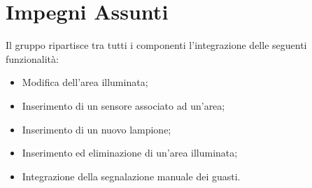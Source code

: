 \documentclass[a4paper, 12pt]{article}
\begin{document}
\section*{Impegni Assunti}
Il gruppo ripartisce tra tutti i componenti l'integrazione delle seguenti funzionalità:
\begin{itemize}
    \item Modifica dell'area illuminata;
    \item Inserimento di un sensore associato ad un'area;
    \item Inserimento di un nuovo lampione;
    \item Inserimento ed eliminazione di un'area illuminata;
    \item Integrazione della segnalazione manuale dei guasti.
\end{itemize}
\end{document}
